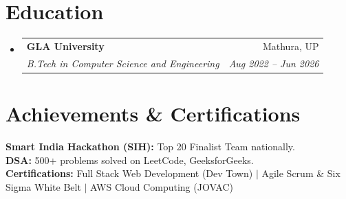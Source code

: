 \documentclass[letterpaper,10pt]{article}
\makeatletter
\newcommand{\resumeSubheading}[4]{
  \vspace{-1pt}\item
    \begin{tabular*}{0.97\textwidth}[t]{l@{\extracolsep{\fill}}r}
      \textbf{#1} & #2 \\
      \textit{\small#3} & \textit{\small #4} \\
    \end{tabular*}\vspace{-1pt}
}
\newcommand{\resumeSubHeadingListStart}{\begin{itemize}[leftmargin=0.15in, label={}, topsep=0pt, partopsep=0pt]}
\newcommand{\resumeSubHeadingListEnd}{\end{itemize}\vspace{-1pt}}
\makeatother
\begin{document}
\section{Education}
\resumeSubHeadingListStart
\resumeSubheading
{GLA University}{Mathura, UP}
{B.Tech in Computer Science and Engineering}{Aug 2022 -- Jun 2026}
\resumeSubHeadingListEnd

\section{Achievements \& Certifications}
\begin{itemize}[leftmargin=0.15in, label={}, topsep=0pt, partopsep=0pt, itemsep=0pt]
\small{\item{
\textbf{Smart India Hackathon (SIH):} Top 20 Finalist Team nationally. \\
\textbf{DSA:} 500+ problems solved on LeetCode, GeeksforGeeks. \\
\textbf{Certifications:} Full Stack Web Development (Dev Town) $|$ Agile Scrum \& Six Sigma White Belt $|$ AWS Cloud Computing (JOVAC)
}}
\end{itemize}

\end{document}
